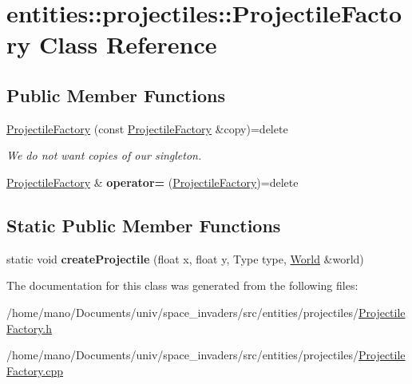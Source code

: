 \hypertarget{classentities_1_1projectiles_1_1ProjectileFactory}{}\section{entities\+:\+:projectiles\+:\+:Projectile\+Factory Class Reference}
\label{classentities_1_1projectiles_1_1ProjectileFactory}
\subsection*{Public Member Functions}
\begin{DoxyCompactItemize}
\item 
\mbox{\label{classentities_1_1projectiles_1_1ProjectileFactory_ad198f3f077022468b6bdd2d114c3a969}} 
\hyperlink{classentities_1_1projectiles_1_1ProjectileFactory_ad198f3f077022468b6bdd2d114c3a969}{Projectile\+Factory} (const \hyperlink{classentities_1_1projectiles_1_1ProjectileFactory}{Projectile\+Factory} \&copy)=delete
\begin{DoxyCompactList}\small\item\em We do not want copies of our singleton. \end{DoxyCompactList}\item 
\mbox{\label{classentities_1_1projectiles_1_1ProjectileFactory_a23c5feb5df880e4cf133f7e9739deda7}} 
\hyperlink{classentities_1_1projectiles_1_1ProjectileFactory}{Projectile\+Factory} \& {\bfseries operator=} (\hyperlink{classentities_1_1projectiles_1_1ProjectileFactory}{Projectile\+Factory})=delete
\end{DoxyCompactItemize}
\subsection*{Static Public Member Functions}
\begin{DoxyCompactItemize}
\item 
\mbox{\label{classentities_1_1projectiles_1_1ProjectileFactory_ae2fdae24114f0a54e474e1cf14eb34d5}} 
static void {\bfseries create\+Projectile} (float x, float y, Type type, \hyperlink{classWorld}{World} \&world)
\end{DoxyCompactItemize}


The documentation for this class was generated from the following files\+:\begin{DoxyCompactItemize}
\item 
/home/mano/\+Documents/univ/space\+\_\+invaders/src/entities/projectiles/\hyperlink{ProjectileFactory_8h}{Projectile\+Factory.\+h}\item 
/home/mano/\+Documents/univ/space\+\_\+invaders/src/entities/projectiles/\hyperlink{ProjectileFactory_8cpp}{Projectile\+Factory.\+cpp}\end{DoxyCompactItemize}
